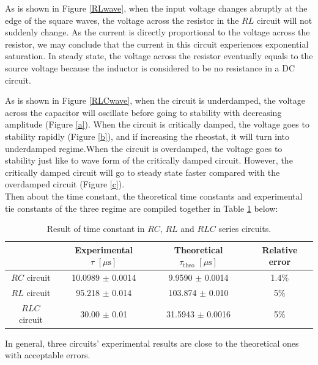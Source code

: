 \documentclass{article}
\begin{document}
As is shown in Figure \ref{RLwave}, when the input voltage changes abruptly at the edge of the square waves, the voltage across the resistor in the $RL$ circuit will not suddenly change. As the current is directly proportional to the voltage across the resistor, we may conclude that the current in this circuit experiences exponential saturation. In steady state, the voltage across the resistor eventually equals to the source voltage because the inductor is considered to be no resistance in a DC circuit. 

As is shown in Figure \ref{RLCwave}, when the circuit is underdamped, the voltage across the capacitor will oscillate before going to stability with decreasing amplitude (Figure \ref{a}). When the circuit is critically damped, the voltage goes to stability rapidly (Figure \ref{b}), and if increasing the rheostat, it will turn into underdamped regime.When the circuit is overdamped, the voltage goes to stability just like to wave form of the critically damped circuit. However, the critically damped circuit will go to steady state faster compared with the overdamped circuit (Figure \ref{c}).\\

Then about the time constant, the theoretical time constants and experimental tie constants of the three regime are compiled together in Table \ref{TableResult} below:

\begin{table}[H]\centering
    \begin{tabular}{cccc}
        \toprule
                      & Experimental $\tau\,\,[\mu\text{s}]$ & Theoretical $\tau_{\text{theo}}\,\,[\mu\text{s}]$ & Relative error \\
        \midrule
        $RC$ circuit  & 10.0989 $\pm$ 0.0014                 & 9.9590 $\pm$ 0.0014                              & 1.4$\%$      \\
        $RL$ circuit  & 95.218 $\pm$ 0.014                  & 103.874 $\pm$ 0.010                                & 5$\%$       \\
        $RLC$ circuit & 30.00 $\pm$ 0.01                     & 31.5943 $\pm$ 0.0016                              & 5$\%$      \\
        \bottomrule
    \end{tabular}
    \caption{Result of time constant in $RC$, $RL$ and $RLC$ series circuits.}\label{TableResult}
\end{table}

In general, three circuits' experimental results are close to the theoretical ones with acceptable errors. 
\end{document}
